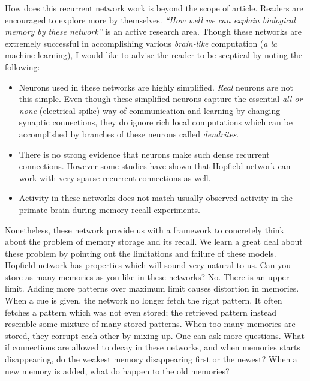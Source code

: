 \documentclass[]{resonance}
\begin{document}
How does this recurrent network work is beyond the scope of article. Readers are
encouraged to explore more by themselves. \emph{``How well we can explain biological
memory by these network''} is an active research area.  Though these networks are
extremely successful in accomplishing various \textit{brain-like} computation
(\textit{a la} machine learning), I would like to advise the reader to be sceptical by
noting the following:

\begin{itemize}
    \item  Neurons used in these networks are highly simplified. \textit{Real}
        neurons are not this simple. Even though these simplified neurons
        capture the essential \textit{all-or-none} (electrical spike) way of
        communication and learning by changing synaptic connections, they do
        ignore rich local computations which can be accomplished by branches of
        these neurons called \textit{dendrites}.
    \item  There is no strong evidence that neurons make such dense recurrent
        connections. However some studies have shown that Hopfield network can
        work with very sparse recurrent connections as well. 
    \item Activity in these networks does not match usually observed activity 
        in the primate brain during memory-recall experiments.
\end{itemize}


Nonetheless, these network provide us with a framework to concretely think about
the problem of memory storage and its recall. We learn a great deal about these
problem by pointing out the limitations and failure of these models. Hopfield
network has properties which will sound very natural to us. Can you store as
many memories as you like in these networks? No. There is an upper limit. Adding
more patterns over maximum limit causes distortion in memories. When a cue is
given, the network no longer fetch the right pattern. It often fetches a pattern
which was not even stored; the retrieved pattern instead resemble some mixture
of many stored patterns. When too many memories are stored, they corrupt each
other by mixing up. One can ask more questions. What if connections are allowed 
to decay in these networks, and when memories starts disappearing, do the
weakest memory disappearing first or the newest? When a new memory is added,
what do happen to the old memories?
\end{document}
